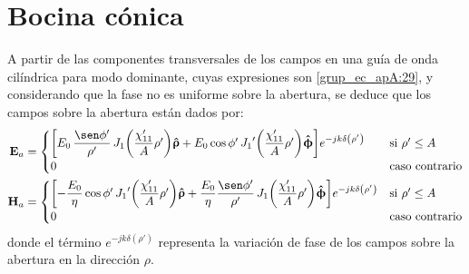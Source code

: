 \section{Bocina cónica}
\label{subsec_apendice_c_boci_coni}

A partir de las componentes transversales de los campos en una guía de onda cilíndrica para modo dominante, cuyas expresiones son \eqref{grup_ec_apA:29}, y considerando que la fase no es uniforme sobre la abertura, se deduce que los campos sobre la abertura están dados por:
\begin{align}
\mathbf{E}_a &= 
\begin{cases} 
\makebox[0pt][l]{$\left[E_0\,\dfrac{\sen\phi '}{\rho '}\,J_1\!\left(\dfrac{\chi '_{11}}{A}\rho '\right)\!\versor{\uprho} + E_0\cos\phi '\,{J_1}'\!\left(\dfrac{\chi '_{11}}{A}\rho '\right)\!\versor{\upphi}\right]\!e^{-jk\delta\left(\rho '\right)}$}\hphantom{\left[- \dfrac{E_0}{\eta}\cos\phi '\,{J_1}'\!\left(\dfrac{\chi '_{11}}{A}\rho '\right)\!\versor{\uprho} + \dfrac{E_0}{\eta}\dfrac{\sen\phi '}{\rho '}\,J_1\!\left(\dfrac{\chi '_{11}}{A}\rho '\right)\!\versor{\upphi}\right]\!e^{-jk\delta\left(\rho '\right)}} &\text{si } \rho '\leq A\\
0 &\text{caso contrario}
\end{cases}
\label{ec_apC:113}\\
\mathbf{H}_a &= 
\begin{cases} 
\left[- \dfrac{E_0}{\eta}\cos\phi '\,{J_1}'\!\left(\dfrac{\chi '_{11}}{A}\rho '\right)\!\versor{\uprho} + \dfrac{E_0}{\eta}\dfrac{\sen\phi '}{\rho '}\,J_1\!\left(\dfrac{\chi '_{11}}{A}\rho '\right)\!\versor{\upphi}\right]\!e^{-jk\delta\left(\rho '\right)} &\text{si } \rho '\leq A\\
0  &\text{caso contrario}
\end{cases}
\label{ec_apC:114}
\end{align}
donde el término $e^{-jk\delta\left(\rho '\right)}$ representa la variación de fase de los campos sobre la abertura en la dirección $\rho$.

